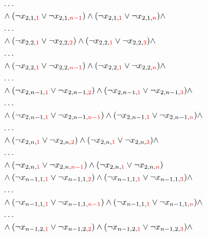 \documentclass[11pt, a4paper]{article}
\begin{document}
\begin{align*}
		\\ & \dots \\
		& \wedge (\neg x_{2,1,{\color{red} 1}} \vee \neg x_{2,1,{\color{red} n-1}}) \wedge (\neg x_{2,1,{\color{red} 1}} \vee \neg x_{2,1,{\color{red} n}}) \wedge 
		\\ & \dots \\
		& \wedge (\neg x_{2,2,{\color{red} 1}} \vee \neg x_{2,2,{\color{red} 2}}) \wedge (\neg x_{2,2,{\color{red} 1}} \vee \neg x_{2,2,{\color{red} 3}}) \wedge 
		\\ & \dots \\
		& \wedge (\neg x_{2,2,{\color{red} 1}} \vee \neg x_{2,2,{\color{red} n-1}}) \wedge (\neg x_{2,2,{\color{red} 1}} \vee \neg x_{2,2,{\color{red} n}}) \wedge
		\\ & \dots \\
		& \wedge (\neg x_{2,n-1,{\color{red} 1}} \vee \neg x_{2,n-1,{\color{red} 2}}) \wedge (\neg x_{2,n-1,{\color{red} 1}} \vee \neg x_{2,n-1,{\color{red} 3}}) \wedge
		\\ & \dots \\
		& \wedge (\neg x_{2,n-1,{\color{red} 1}} \vee \neg x_{2,n-1,{\color{red} n-1}}) \wedge (\neg x_{2,n-1,{\color{red} 1}} \vee \neg x_{2,n-1,{\color{red} n}}) \wedge 
		\\ & \dots \\
		& \wedge (\neg x_{2,n,{\color{red} 1}} \vee \neg x_{2,n,{\color{red} 2}}) \wedge (\neg x_{2,n,{\color{red} 1}} \vee \neg x_{2,n,{\color{red} 3}}) \wedge 
		\\ & \dots \\
		& \wedge (\neg x_{2,n,{\color{red} 1}} \vee \neg x_{2,n,{\color{red} n-1}}) \wedge (\neg x_{2,n,{\color{red} 1}} \vee \neg x_{2,n,{\color{red} n}}) \\
		& \wedge (\neg x_{n-1,1,{\color{red} 1}} \vee \neg x_{n-1,1,{\color{red} 2}}) \wedge (\neg x_{n-1,1,{\color{red} 1}} \vee \neg x_{n-1,1,{\color{red} 3}}) \wedge 
		\\ & \dots \\
		& \wedge (\neg x_{n-1,1,{\color{red} 1}} \vee \neg x_{n-1,1,{\color{red} n-1}}) \wedge (\neg x_{n-1,1,{\color{red} 1}} \vee \neg x_{n-1,1,{\color{red} n}}) \wedge
		\\ & \dots \\
		& \wedge (\neg x_{n-1,2,{\color{red} 1}} \vee \neg x_{n-1,2,{\color{red} 2}}) \wedge (\neg x_{n-1,2,{\color{red} 1}} \vee \neg x_{n-1,2,{\color{red} 3}}) \wedge 

\end{align*}
\end{document}
